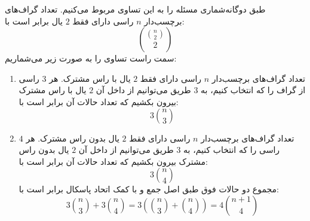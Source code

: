         \p
طبق دوگانه‌شماری مسئله را به این تساوی مربوط می‌کنیم. تعداد گراف‌های برچسب‌دار
$n$
راسی دارای فقط
$2$
یال برابر است با:
$$\binom{\binom{n}{2}}{2}$$
سمت راست تساوی را به صورت زیر می‌شماریم:
\begin{enumerate}
\item
تعداد گراف‌های برچسب‌دار
$n$
راسی دارای فقط
$2$
یال با راس مشترک. هر
$3$
راسی از گراف را که انتخاب کنیم، به
$3$
طریق می‌توانیم از داخل آن
$2$
یال با راس مشترک بیرون بکشیم که تعداد حالات آن برابر است با:
$$3\binom{n}{3}$$
\item
تعداد گراف‌های برچسب‌دار
$n$
راسی دارای فقط
$2$
یال بدون راس مشترک. هر
$4$
راسی را که انتخاب کنیم، به
$3$
طریق می‌توانیم از داخل آن
$2$
یال بدون راس مشترک بیرون بکشیم که تعداد حالات آن برابر است با:
$$3\binom{n}{4}$$
مجموع دو حالات فوق طبق اصل جمع و با کمک اتحاد پاسکال برابر است با:
$$3\binom n 3 + 3\binom n 4 = 3(\binom n 3 + \binom n 4) = 4\binom{n+1}{4}$$
\end{enumerate}